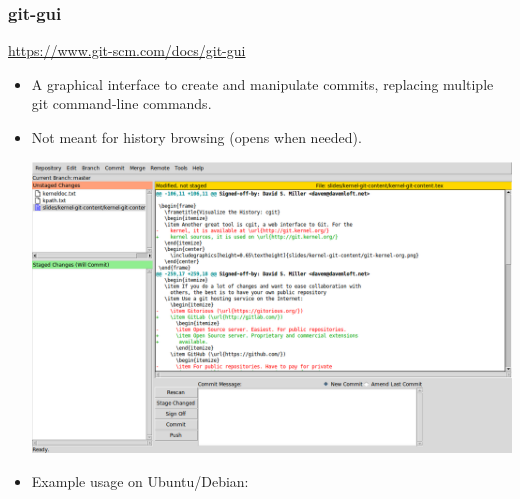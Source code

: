 \begin{frame}
  \frametitle{git-gui}
  \url{https://www.git-scm.com/docs/git-gui}
  \begin{itemize}
  \item A graphical interface to create and manipulate commits,
    replacing multiple git command-line commands.
  \item Not meant for history browsing (opens 
    when needed).
  \begin{center}
    \includegraphics[height=0.45\textheight]{slides/kernel-git-content/git-gui.png}
  \end{center}
  \item Example usage on Ubuntu/Debian:\\
    \\
  \end{itemize}
\end{frame}


